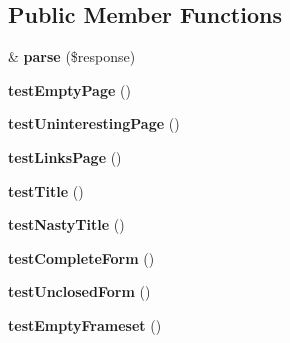 \subsection*{Public Member Functions}
\begin{DoxyCompactItemize}
\item 
\hypertarget{class_test_of_page_scraping_ac5a3b0a7b140a98a4ec0db50af84579b}{
\& {\bfseries parse} (\$response)}
\label{class_test_of_page_scraping_ac5a3b0a7b140a98a4ec0db50af84579b}

\item 
\hypertarget{class_test_of_page_scraping_a79aa0cb591b7e2e09cbf6a015fe3b447}{
{\bfseries testEmptyPage} ()}
\label{class_test_of_page_scraping_a79aa0cb591b7e2e09cbf6a015fe3b447}

\item 
\hypertarget{class_test_of_page_scraping_a40aad17c5ff59d2ccf905fb28c618458}{
{\bfseries testUninterestingPage} ()}
\label{class_test_of_page_scraping_a40aad17c5ff59d2ccf905fb28c618458}

\item 
\hypertarget{class_test_of_page_scraping_ab0fb571261859627015b86cbb21f6943}{
{\bfseries testLinksPage} ()}
\label{class_test_of_page_scraping_ab0fb571261859627015b86cbb21f6943}

\item 
\hypertarget{class_test_of_page_scraping_a5c709d120f35e266e856c262c788acaf}{
{\bfseries testTitle} ()}
\label{class_test_of_page_scraping_a5c709d120f35e266e856c262c788acaf}

\item 
\hypertarget{class_test_of_page_scraping_a3dc9765a17d73c1df0b1bc67eb2aa279}{
{\bfseries testNastyTitle} ()}
\label{class_test_of_page_scraping_a3dc9765a17d73c1df0b1bc67eb2aa279}

\item 
\hypertarget{class_test_of_page_scraping_aaacab89f350a0fe6e3d77c1c7ef22066}{
{\bfseries testCompleteForm} ()}
\label{class_test_of_page_scraping_aaacab89f350a0fe6e3d77c1c7ef22066}

\item 
\hypertarget{class_test_of_page_scraping_aa789ad4b0c1f2486f049feab88a9edd3}{
{\bfseries testUnclosedForm} ()}
\label{class_test_of_page_scraping_aa789ad4b0c1f2486f049feab88a9edd3}

\item 
\hypertarget{class_test_of_page_scraping_a6ecbbeb70e2ecb77bf694f8796a2c518}{
{\bfseries testEmptyFrameset} ()}
\label{class_test_of_page_scraping_a6ecbbeb70e2ecb77bf694f8796a2c518}


\end{DoxyCompactItemize}
